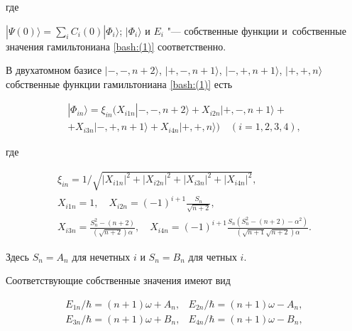 где

$|\Psi(0)\rangle =  \sum _{i} C_i(0) |\Phi_i\rangle$;  $|\Phi_i\rangle$ и $E_{i}$ "---  собственные функции и~собственные значения гамильтониана \eqref{bash:(1)}  соответственно.



В двухатомном базисе $|-, -, n+2\rangle$,  $|+, -, n+1\rangle$,  $|-, +, n+1\rangle$,  $|+, +, n\rangle$  собственные функции гамильтониана \eqref{bash:(1)} есть

\begin{multline}

|\Phi_{in}\rangle = \xi_{in} (X_{i1n} |-,-,n+2\rangle + X_{i2n} |+,-,n+1\rangle + 

\\+ X_{i3n} |-,+,n+1\rangle + X_{i4n} |+,+,n\rangle)\quad (i=1, 2, 3, 4), \label{bash:(6)}

\end{multline}

где

\begin{gather}

\xi_{in}= 1/\sqrt{|X_{i1n}|^2 +|X_{i2n}|^2 + |X_{i3n}|^2 + |X_{i4n}|^2},

\\

X_{i1n} =1,\quad X_{i2n} =(-1)^{i+1} \frac{S_n}{\sqrt{n+2}}, 

\\

X_{i3n} = \frac{S_n^2-(n+2)}{(\sqrt{n+2})\alpha}, \quad X_{i4n} =(-1)^{i+1} \frac{S_n(S_n^2 -(n+2)-\alpha^2)}{(\sqrt{n+1}\sqrt{n+2}) \alpha}.

\end{gather}

Здесь $S_n = A_n$ для нечетных $i$ и $S_n = B_n$ для четных $i$.

Соответствующие собственные значения имеют вид

\begin{equation}

\begin{array}{ll}

E_{1n}/\hbar= (n+1)\omega  + A_n, & E_{2n}/\hbar=(n+1)\omega  - A_n,

\\

 E_{3n}/\hbar=(n+1)\omega  + B_n, & E_{4n}/\hbar=(n+1)\omega  - B_n,

\end{array}

\label{bash:(6)}

\end{equation}

